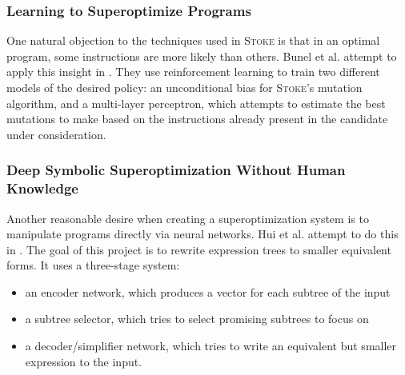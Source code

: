 \documentclass[12pt,twoside]{reedthesis}
\begin{document}
    \subsubsection{Learning to Superoptimize Programs}
    One natural objection to the techniques used in \textsc{Stoke} is that in an optimal program, some instructions are more likely than others.
    Bunel et al. attempt to apply this insight in \cite{bunel2017learning}.
    They use reinforcement learning to train two different models of the desired policy:
        an unconditional bias for \textsc{Stoke}'s mutation algorithm,
        and a multi-layer perceptron\footnotemark,
            which attempts to estimate the best mutations to make based on the instructions already present in the candidate under consideration.
        

    \subsubsection{Deep Symbolic Superoptimization Without Human Knowledge}
    Another reasonable desire when creating a superoptimization system is to manipulate programs directly via neural networks.
    Hui et al. attempt to do this in \cite{hui2020deep}. 
    The goal of this project is to rewrite expression trees to smaller equivalent forms. 
    It uses a three-stage system:
    \begin{itemize}
        \item an encoder network\footnotemark, which produces a vector for each subtree of the input
        \item a subtree selector, which tries to select promising subtrees to focus on
        \item a decoder/simplifier network, which tries to write an equivalent but smaller expression to the input.
    \end{itemize}
        
        
\end{document}
